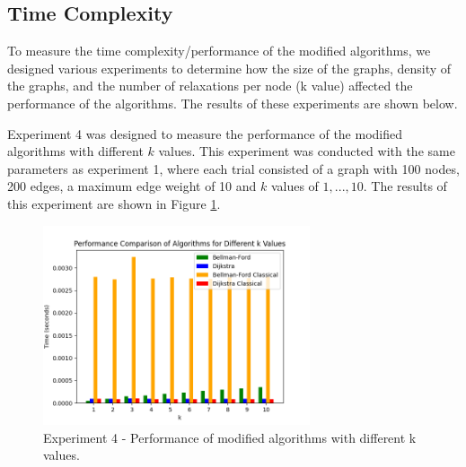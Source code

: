 \documentclass[12pt]{article}
\begin{document}
\subsection*{Time Complexity}
To measure the time complexity/performance of the modified algorithms, we designed various experiments
to determine how the size of the graphs, density of the graphs, and the number of relaxations per node (k value) affected the performance of the algorithms.
The results of these experiments are shown below.

Experiment 4 was designed to measure the performance of the modified algorithms with different $k$ values.
This experiment was conducted with the same parameters as 
experiment 1, where each trial consisted of a graph with 100 nodes, 200 edges, a maximum edge weight of 10 and $k$ values of $1, ... , 10$.
The results of this experiment are shown in Figure \ref{fig:Figure 4}. 
\begin{figure}[H] 
    \centering
    \includegraphics[width=0.7\textwidth]{Figures/Performance_kvals.png} 
    \caption{\footnotesize Experiment 4 - Performance of modified algorithms with different k values.}
    \label{fig:Figure 4} 
\end{figure}
\end{document}
